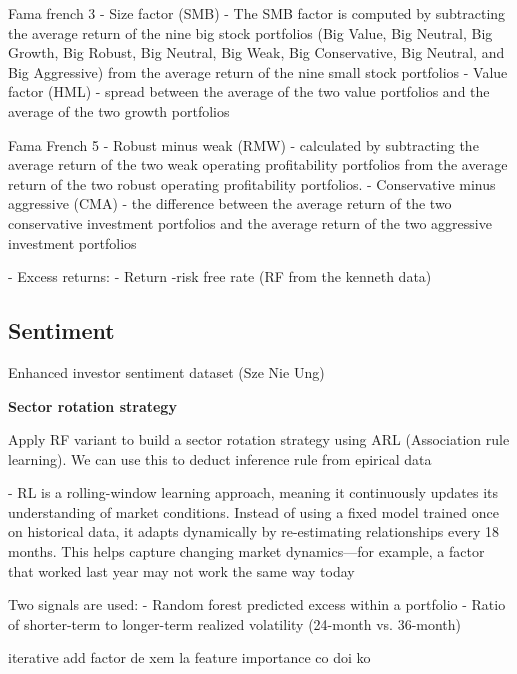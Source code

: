 Fama french 3
- Size factor (SMB)
    - The SMB factor is computed by subtracting the average return of the nine big stock portfolios
    (Big Value, Big Neutral, Big Growth, Big Robust, Big Neutral, Big Weak, Big Conservative,
    Big Neutral, and Big Aggressive) from the average return of the nine small stock portfolios
- Value factor (HML)
    -  spread between the average of the two value portfolios and the average of the two growth portfolios

Fama French 5
- Robust minus weak (RMW)
    - calculated by subtracting the average return of the two
    weak operating profitability portfolios from the average return of the two robust operating
    profitability portfolios.
- Conservative minus aggressive (CMA)
    - the difference between the average return of
    the two conservative investment portfolios and the average return of the two aggressive
    investment portfolios 

- Excess returns:
    - Return -risk free rate (RF from the kenneth data)

\subsection{Sentiment}
Enhanced investor sentiment dataset (Sze Nie Ung)








\textbf{Sector rotation strategy}

Apply RF variant to build a sector rotation strategy using ARL (Association rule learning). We can use this to deduct inference rule from epirical data

- RL is a rolling-window learning approach, meaning it continuously updates its understanding of market conditions.
Instead of using a fixed model trained once on historical data, it adapts dynamically by re-estimating relationships every 18 months.
This helps capture changing market dynamics—for example, a factor that worked last year may not work the same way today

Two signals are used:
- Random forest predicted excess within a portfolio
- Ratio of shorter-term to longer-term realized volatility (24-month vs. 36-month)

iterative add factor de xem la feature importance co doi ko 